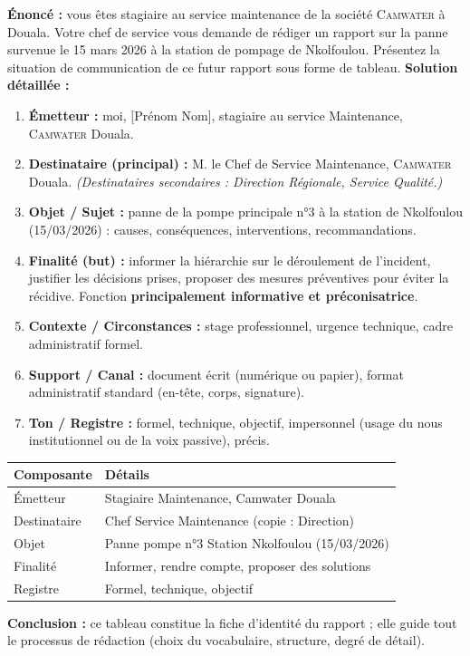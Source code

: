 \documentclass[11pt]{article}
\newcommand{\cle}[1]{{\popxbold\color{popdark}#1}}
\begin{document}
\begin{exoresolu}
    \textbf{Énoncé :} vous êtes stagiaire au service maintenance de la société \textsc{Camwater} à Douala. Votre chef de service vous demande de rédiger un rapport sur la panne survenue le 15 mars 2026 à la station de pompage de Nkolfoulou. Présentez la situation de communication de ce futur rapport sous forme de tableau.
    \tcblower
    \textbf{Solution détaillée :}
    \begin{enumerate}
        \item \textbf{Émetteur :} moi, [Prénom Nom], stagiaire au service Maintenance, \textsc{Camwater} Douala.
        \item \textbf{Destinataire (principal) :} M. le Chef de Service Maintenance, \textsc{Camwater} Douala. \emph{(Destinataires secondaires : Direction Régionale, Service Qualité.)}
        \item \textbf{Objet / Sujet :} panne de la pompe principale n°3 à la station de Nkolfoulou (15/03/2026) : causes, conséquences, interventions, recommandations.
        \item \textbf{Finalité (but) :} informer la hiérarchie sur le déroulement de l'incident, justifier les décisions prises, proposer des mesures préventives pour éviter la récidive. Fonction \textbf{principalement informative et préconisatrice}.
        \item \textbf{Contexte / Circonstances :} stage professionnel, urgence technique, cadre administratif formel.
        \item \textbf{Support / Canal :} document écrit (numérique ou papier), format administratif standard (en-tête, corps, signature).
        \item \textbf{Ton / Registre :} formel, technique, objectif, impersonnel (usage du \og nous\fg{} institutionnel ou de la voix passive), précis.
    \end{enumerate}
    \begin{center}
        \begin{tabularx}{\linewidth}{|l|X|}\hline
        \rowcolor{popblueL} \textbf{Composante} & \textbf{Détails} \\ \hline
        Émetteur & Stagiaire Maintenance, Camwater Douala \\ \hline
        Destinataire & Chef Service Maintenance (copie : Direction) \\ \hline
        Objet & Panne pompe n°3 Station Nkolfoulou (15/03/2026) \\ \hline
        Finalité & Informer, rendre compte, proposer des solutions \\ \hline
        Registre & Formel, technique, objectif \\ \hline
    \end{tabularx}
    \end{center}
    \textbf{Conclusion :} ce tableau constitue la \cle{fiche d'identité} du rapport ; elle guide tout le processus de rédaction (choix du vocabulaire, structure, degré de détail).
\end{exoresolu}
\end{document}
